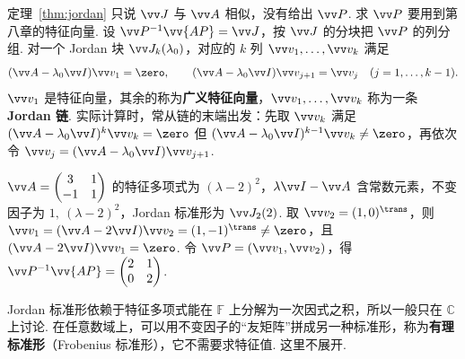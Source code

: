 	定理~\ref{thm:jordan} 只说 $\vv J$ 与 $\vv A$ 相似，没有给出 $\vv P$. 求 $\vv P$ 要用到第八章的特征向量. 设 $\vv P^{-1}\vv{AP}=\vv J$，按 $\vv J$ 的分块把 $\vv P$ 的列分组. 对一个 Jordan 块 $\vv J_k(\lambda_0)$，对应的 $k$ 列 $\vv v_1,\ldots,\vv v_k$ 满足
	\[(\vv A-\lambda_0\vv I)\vv v_1=\zero,\qquad(\vv A-\lambda_0\vv I)\vv v_{j+1}=\vv v_j\quad(j=1,\ldots,k-1).\]
	$\vv v_1$ 是特征向量，其余的称为\textbf{广义特征向量}，$\vv v_1,\ldots,\vv v_k$ 称为一条 \textbf{Jordan 链}. 实际计算时，常从链的末端出发：先取 $\vv v_k$ 满足 $(\vv A-\lambda_0\vv I)^k\vv v_k=\zero$ 但 $(\vv A-\lambda_0\vv I)^{k-1}\vv v_k\ne\zero$，再依次令 $\vv v_{j}=(\vv A-\lambda_0\vv I)\vv v_{j+1}$.
	
	\begin{example}
		$\vv A=\begin{pmatrix}3&1\\-1&1\end{pmatrix}$ 的特征多项式为 $(\lambda-2)^2$，$\lambda\vv I-\vv A$ 含常数元素，不变因子为 $1,\ (\lambda-2)^2$，Jordan 标准形为 $\vv J_2(2)$. 取 $\vv v_2=(1,0)^\trans$，则 $\vv v_1=(\vv A-2\vv I)\vv v_2=(1,-1)^\trans\ne\zero$，且 $(\vv A-2\vv I)\vv v_1=\zero$. 令 $\vv P=(\vv v_1,\vv v_2)$，得 $\vv P^{-1}\vv{AP}=\begin{pmatrix}2&1\\0&2\end{pmatrix}$.
	\end{example}
	
	\begin{remark}
		Jordan 标准形依赖于特征多项式能在 $\mathbb{F}$ 上分解为一次因式之积，所以一般只在 $\mathbb{C}$ 上讨论. 在任意数域上，可以用不变因子的“友矩阵”拼成另一种标准形，称为\textbf{有理标准形}（Frobenius 标准形），它不需要求特征值. 这里不展开.
	\end{remark}
	
